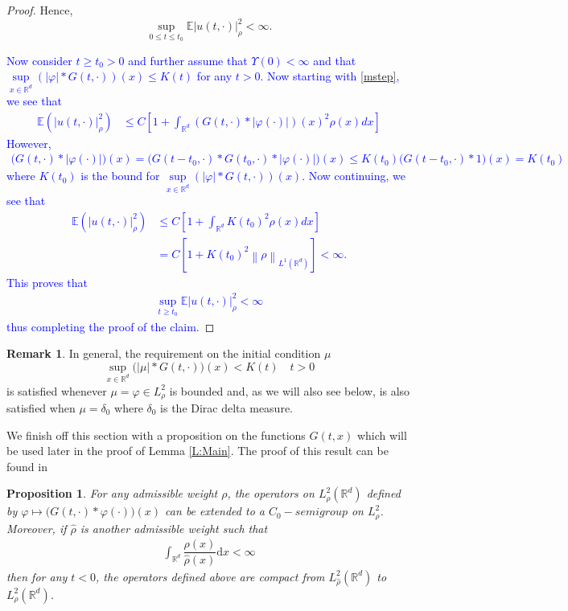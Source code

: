 \documentclass[a4paper,11pt]{article}
\numberwithin{equation}{section}
\theoremstyle{plain}
\newtheorem{proposition}[theorem]{Proposition}
\theoremstyle{definition}
\newtheorem{remark}[theorem]{Remark}
\newcommand{\R}{\mathbb{R}}
\newcommand{\E}{\mathbb{E}}
\newcommand{\Norm}[1]{\left\|  #1   \right\|}
\newcommand{\ud}{\ensuremath{\mathrm{d}}}
\begin{document}
\begin{proof}
Hence,
 \[
 \sup_{0 \le t \le t_0}\E |u(t,\cdot)|_\rho^2 < \infty.
 \]

\textcolor{blue}{Now consider $t\ge t_0>0$ and further assume that $\Upsilon(0) < \infty$ and that $\sup\limits_{x\in \R^d}(|\varphi|*G(t,\cdot))(x) \le K(t)$ for any $t>0$. Now starting with \eqref{mstep}, we see that
\begin{align*}
	\E\left(| u(t,\cdot)|_\rho^2\right) 
	   & \le  C\left[1+\int_{\R^d}(G(t,\cdot)*|\varphi(\cdot)|)(x)^2\rho(x)dx\right]
\end{align*}
However, 
\begin{align*}
\big(G(t,\cdot)*|\varphi(\cdot)|\big)(x) = \big(G(t-t_0,\cdot)*G(t_0,\cdot)*|\varphi(\cdot)|\big)(x) \le K(t_0) \big(G(t-t_0,\cdot)*1\big)(x) = K(t_0)
\end{align*}
where $K(t_0)$ is the bound for $\sup\limits_{x\in \R^d}(|\varphi|*G(t,\cdot))(x)$. Now continuing, we see that
\begin{align*}
	\E\left(| u(t,\cdot)|_\rho^2\right)& \le  C\left[1+\int_{\R^d}K(t_0)^2\rho(x)dx\right]
	\\ & = C \left[ 1+ K(t_0)^2\Norm{\rho}_{L^1(\R^d)}  \right] < \infty.
\end{align*}
This proves that
\begin{align*}
	\sup_{t \ge t_0}\E |u(t,\cdot)|_\rho^2 < \infty 
\end{align*}
thus completing the proof of the claim.}
\end{proof}

\begin{remark}
	In general, the requirement on the initial condition $\mu$ 
		\[
			\sup\limits_{x\in \R^d}\big(|\mu|*G(t,\cdot)\big)(x) < K(t) \quad t>0
		\]
	is satisfied whenever $\mu=\varphi \in L^2_\rho$ is bounded and, as we will also see below, is also satisfied when $\mu = \delta_0$ where $\delta_0$ is the Dirac delta measure. 
\end{remark}

We finish off this section with a proposition on the functions $G(t,x)$ which will be used later in the proof of Lemma \ref{L:Main}. The proof of this result can be found in \cite{TessitoreZabczyk98M} \\

\begin{proposition} 
	\label{P:weight}
	For any admissible weight $\rho$, the operators on $L^2_\rho(\R^d)$ defined by $\varphi \mapsto \big(G(t,\cdot)*\varphi(\cdot)\big)(x)$ can be extended to a $C_0-semigroup$ on $L^2_\rho$. Moreover, if $\hat\rho$ is another admissible weight such that 
	\begin{align*}
		\int_{\R^d}\dfrac{\rho(x)}{\hat\rho(x)}\ud x < \infty
	\end{align*}
	then for any $t<0$, the operators defined above are compact from $L^2_{\hat\rho}(\R^d)$ to $L^2_\rho(\R^d)$. 
\end{proposition}
\end{document}
